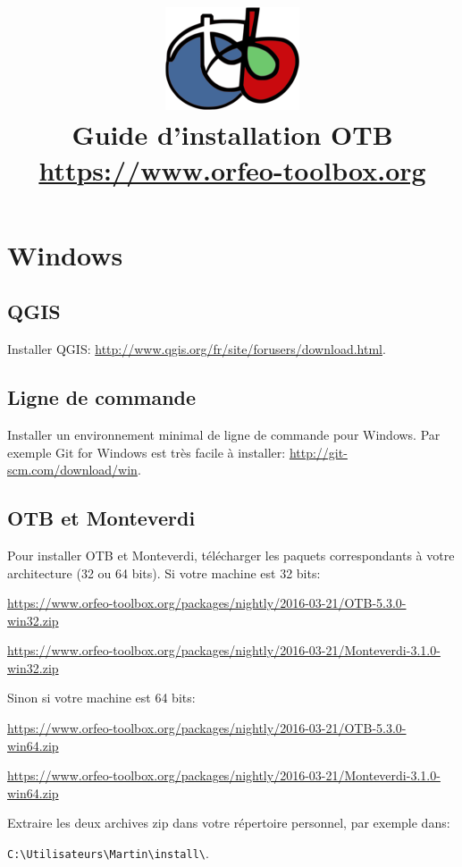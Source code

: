 \documentclass[10pt,a4paper]{article}
\title{\includegraphics[scale=1]{Art/otb-logo.png}\\
  Guide d'installation OTB\\
  {\small\url{https://www.orfeo-toolbox.org}}
}
\begin{document}
\maketitle

\tableofcontents

\clearpage
\section{Windows}

\subsection{QGIS}
Installer QGIS: \url{http://www.qgis.org/fr/site/forusers/download.html}.
\subsection{Ligne de commande}
Installer un environnement minimal de ligne de commande pour Windows. Par exemple
Git for Windows est très facile à installer:
\url{http://git-scm.com/download/win}.

\subsection{OTB et Monteverdi}
Pour installer OTB et Monteverdi, télécharger les paquets
correspondants à votre architecture (32 ou 64 bits). Si votre machine est 32
bits:

\begin{flushleft}
\url{https://www.orfeo-toolbox.org/packages/nightly/2016-03-21/OTB-5.3.0-win32.zip}

\url{https://www.orfeo-toolbox.org/packages/nightly/2016-03-21/Monteverdi-3.1.0-win32.zip}
\end{flushleft}

Sinon si votre machine est 64 bits:

\begin{flushleft}
\url{https://www.orfeo-toolbox.org/packages/nightly/2016-03-21/OTB-5.3.0-win64.zip}

\url{https://www.orfeo-toolbox.org/packages/nightly/2016-03-21/Monteverdi-3.1.0-win64.zip}
\end{flushleft}

Extraire les deux archives zip dans votre répertoire personnel, par exemple dans:\\
\begin{centering}
\texttt{C:{\textbackslash}Utilisateurs{\textbackslash}Martin{\textbackslash}install{\textbackslash}}.
\end{centering}
\end{document}
